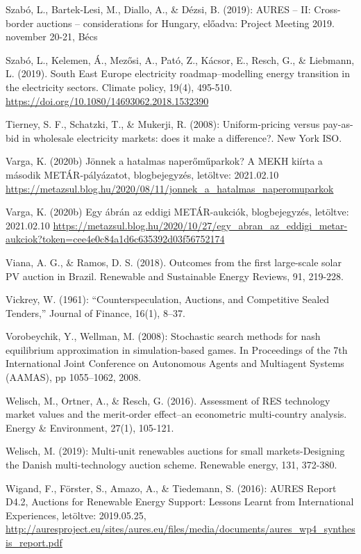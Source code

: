 \documentclass[twoside, magyar, showtrims]{corvinusphd}
\begin{document}
\begin{thebibliography}{99}
Szabó, L., Bartek-Lesi, M., Diallo, A., \& Dézsi, B. (2019): AURES – II: Cross-border  auctions – considerations for Hungary, előadva: Project Meeting 2019. november 20-21, Bécs

Szabó, L., Kelemen, Á., Mezősi, A., Pató, Z., Kácsor, E., Resch, G., \& Liebmann, L. (2019). South East Europe electricity roadmap–modelling energy transition in the electricity sectors. Climate policy, 19(4), 495-510.
\url{https://doi.org/10.1080/14693062.2018.1532390}

Tierney, S. F., Schatzki, T., \& Mukerji, R. (2008): Uniform-pricing versus pay-as-bid in wholesale electricity markets: does it make a difference?. New York ISO.

Varga, K. (2020b) Jönnek a hatalmas naperőműparkok? A MEKH kiírta a második METÁR-pályázatot, blogbejegyzés, letöltve: 2021.02.10
\url{https://metazsul.blog.hu/2020/08/11/jonnek\_a\_hatalmas\_naperomuparkok}

Varga, K. (2020b) Egy ábrán az eddigi METÁR-aukciók, blogbejegyzés, letöltve: 2021.02.10
\url{https://metazsul.blog.hu/2020/10/27/egy\_abran\_az\_eddigi\_metar-aukciok?token=cee4e0c84a1d6c635392d03f56752174}

Viana, A. G., \& Ramos, D. S. (2018). Outcomes from the first large-scale solar PV auction in Brazil. Renewable and Sustainable Energy Reviews, 91, 219-228.

Vickrey, W. (1961): “Counterspeculation, Auctions, and Competitive Sealed Tenders,” Journal of Finance, 16(1), 8–37.

Vorobeychik, Y., Wellman, M. (2008): Stochastic search methods for nash equilibrium approximation in simulation-based games. In Proceedings of the 7th International Joint Conference on
Autonomous Agents and Multiagent Systems (AAMAS), pp 1055–1062, 2008.

Welisch, M., Ortner, A., \& Resch, G. (2016). Assessment of RES technology market values and the merit-order effect–an econometric multi-country analysis. Energy \& Environment, 27(1), 105-121.

Welisch, M. (2019): Multi-unit renewables auctions for small markets-Designing the Danish multi-technology auction scheme. Renewable energy, 131, 372-380.

Wigand, F., Förster, S., Amazo, A., \& Tiedemann, S. (2016): AURES Report D4.2, Auctions for Renewable Energy Support: Lessons Learnt from International Experiences, letöltve: 2019.05.25, 
\url{http://auresproject.eu/sites/aures.eu/files/media/documents/aures\_wp4\_synthesis\_report.pdf}


\end{thebibliography}
\end{document}

